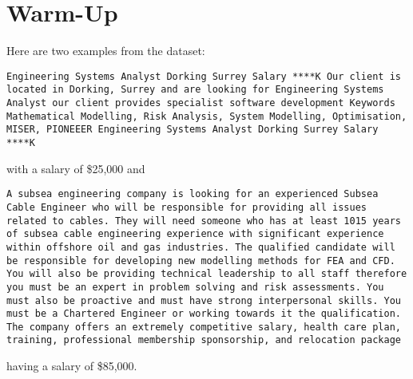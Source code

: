 \documentclass[12pt]{article}
\begin{document}
\section{Warm-Up}
Here are two examples from the dataset:
\begin{lstlisting}
Engineering Systems Analyst Dorking Surrey Salary ****K Our client is located in Dorking, Surrey and are looking for Engineering Systems Analyst our client provides specialist software development Keywords Mathematical Modelling, Risk Analysis, System Modelling, Optimisation, MISER, PIONEEER Engineering Systems Analyst Dorking Surrey Salary ****K
\end{lstlisting}
with a salary of \$25,000 and 
\begin{lstlisting}
A subsea engineering company is looking for an experienced Subsea Cable Engineer who will be responsible for providing all issues related to cables. They will need someone who has at least 1015 years of subsea cable engineering experience with significant experience within offshore oil and gas industries. The qualified candidate will be responsible for developing new modelling methods for FEA and CFD. You will also be providing technical leadership to all staff therefore you must be an expert in problem solving and risk assessments. You must also be proactive and must have strong interpersonal skills. You must be a Chartered Engineer or working towards it the qualification. The company offers an extremely competitive salary, health care plan, training, professional membership sponsorship, and relocation package
\end{lstlisting}
having a salary of \$85,000.
\end{document}
